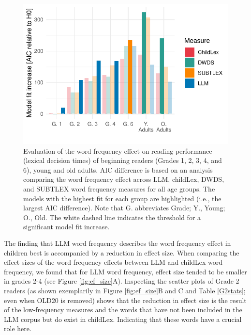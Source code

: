 \documentclass[doc, a4paper]{apa7}
\begin{document}
\begin{figure}[!htbp]
    \centering
    \includegraphics[scale=1]{figures/exp1_modelcomp.pdf}
    \caption{Evaluation of the word frequency effect on reading performance (lexical decision times) of beginning readers (Grades 1, 2, 3, 4, and 6), young and old adults. AIC difference is based on an analysis comparing the word frequency effect across LLM, childLex, DWDS, and SUBTLEX word frequency measures for all age groups. The models with the highest fit for each group are highlighted (i.e., the largest AIC difference). Note that G. abbreviates Grade; Y., Young; O., Old. The white dashed line indicates the threshold for a significant model fit increase.}
\label{fig:modelcomprt}
\end{figure}

The finding that LLM word frequency describes the word frequency effect in children best is accompanied by a reduction in effect size. When comparing the effect sizes of the word frequency effects between LLM and childLex word frequency, we found that for LLM word frequency, effect size tended to be smaller in grades 2-4 (see Figure \ref{fig:ef_size}A). Inspecting the scatter plots of Grade 2 readers (as shown exemplarily in Figure \ref{fig:ef_size}B and C and Table \ref{G2stats}; even when OLD20 is removed) shows that the reduction in effect size is the result of the low-frequency measures and the words that have not been included in the LLM corpus but do exist in childLex. Indicating that these words have a crucial role here.
\end{document}
